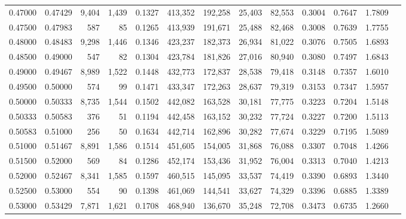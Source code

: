 \begin{tabular}{rrrrrrrrrrrrr}
0.47000 & 0.47429 &  9,404 & 1,439 &                                     0.1327 & 413,352 & 192,258 &  25,403 &  82,553 & 0.3004 & 0.7647 & 1.7809 \\
0.47500 & 0.47983 &    587 &    85 &                                     0.1265 & 413,939 & 191,671 &  25,488 &  82,468 & 0.3008 & 0.7639 & 1.7755 \\
0.48000 & 0.48483 &  9,298 & 1,446 &                                     0.1346 & 423,237 & 182,373 &  26,934 &  81,022 & 0.3076 & 0.7505 & 1.6893 \\
0.48500 & 0.49000 &    547 &    82 &                                     0.1304 & 423,784 & 181,826 &  27,016 &  80,940 & 0.3080 & 0.7497 & 1.6843 \\
0.49000 & 0.49467 &  8,989 & 1,522 &                                     0.1448 & 432,773 & 172,837 &  28,538 &  79,418 & 0.3148 & 0.7357 & 1.6010 \\
0.49500 & 0.50000 &    574 &    99 &                                     0.1471 & 433,347 & 172,263 &  28,637 &  79,319 & 0.3153 & 0.7347 & 1.5957 \\
0.50000 & 0.50333 &  8,735 & 1,544 &                                     0.1502 & 442,082 & 163,528 &  30,181 &  77,775 & 0.3223 & 0.7204 & 1.5148 \\
0.50333 & 0.50583 &    376 &    51 &                                     0.1194 & 442,458 & 163,152 &  30,232 &  77,724 & 0.3227 & 0.7200 & 1.5113 \\
0.50583 & 0.51000 &    256 &    50 &                                     0.1634 & 442,714 & 162,896 &  30,282 &  77,674 & 0.3229 & 0.7195 & 1.5089 \\
0.51000 & 0.51467 &  8,891 & 1,586 &                                     0.1514 & 451,605 & 154,005 &  31,868 &  76,088 & 0.3307 & 0.7048 & 1.4266 \\
0.51500 & 0.52000 &    569 &    84 &                                     0.1286 & 452,174 & 153,436 &  31,952 &  76,004 & 0.3313 & 0.7040 & 1.4213 \\
0.52000 & 0.52467 &  8,341 & 1,585 &                                     0.1597 & 460,515 & 145,095 &  33,537 &  74,419 & 0.3390 & 0.6893 & 1.3440 \\
0.52500 & 0.53000 &    554 &    90 &                                     0.1398 & 461,069 & 144,541 &  33,627 &  74,329 & 0.3396 & 0.6885 & 1.3389 \\
0.53000 & 0.53429 &  7,871 & 1,621 &                                     0.1708 & 468,940 & 136,670 &  35,248 &  72,708 & 0.3473 & 0.6735 & 1.2660 \\

\end{tabular}
